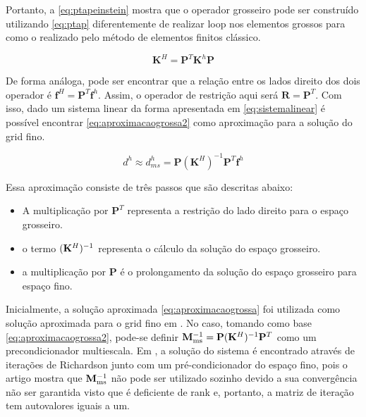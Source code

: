 Portanto, a \eqref{eq:ptapeinstein} mostra que o operador grosseiro pode ser construído utilizando \eqref{eq:ptap} diferentemente de realizar loop nos elementos grossos para como o realizado pelo método de elementos finitos clássico.

\begin{equation} \label{eq:ptap}
    \mathbf{K}^H = \mathbf{P}^T  \mathbf{K}^h \mathbf{P}
\end{equation}

De forma análoga, pode ser encontrar que a relação entre os lados direito dos dois operador é $\mathbf{f}^H = \mathbf{P}^T \mathbf{f}^h$. Assim, o operador de restrição aqui será $\mathbf{R} = \mathbf{P}^T$. Com isso, dado um sistema linear da forma apresentada em \eqref{eq:sistemalinear} é possível encontrar \eqref{eq:aproximacaogrossa2} como aproximação para a solução do grid fino.

\begin{equation} \label{eq:aproximacaogrossa2}
    d^h \approx d^h_{ms} = \mathbf{P} (\mathbf{K}^H)^{-1} \mathbf{P}^{T} \mathbf{f}^h
\end{equation}

Essa aproximação consiste de três passos que são descritas abaixo:

\begin{itemize}
    \item A multiplicação por $\mathbf{P}^T$ representa a restrição do lado direito para o espaço grosseiro.
    \item  o termo $(\mathbf{K}^H)^{-1}$ representa o cálculo da solução do espaço grosseiro.
    \item a multiplicação por $\mathbf{P}$ é o prolongamento da solução do espaço grosseiro para espaço fino.
\end{itemize}


Inicialmente, a solução aproximada \eqref{eq:aproximacaogrossa} foi utilizada como solução aproximada para o grid fino em \cite{thomashou}. No caso, tomando como base \eqref{eq:aproximacaogrossa2}, pode-se definir $\mathbf{M}^{-1}_{\text{ms}} = \mathbf{P} (\mathbf{K}^H)^{-1} \mathbf{P}^{T}$ como um precondicionador multiescala. Em \citet{zhouiterativo}, a solução do sistema é encontrado através de iterações de Richardson junto com um pré-condicionador do espaço fino, pois o artigo mostra que $\mathbf{M}^{-1}_{\text{ms}}$ não pode ser utilizado sozinho devido a sua convergência não ser garantida visto que  é deficiente de rank e, portanto, a matriz de iteração tem autovalores iguais a um. 

